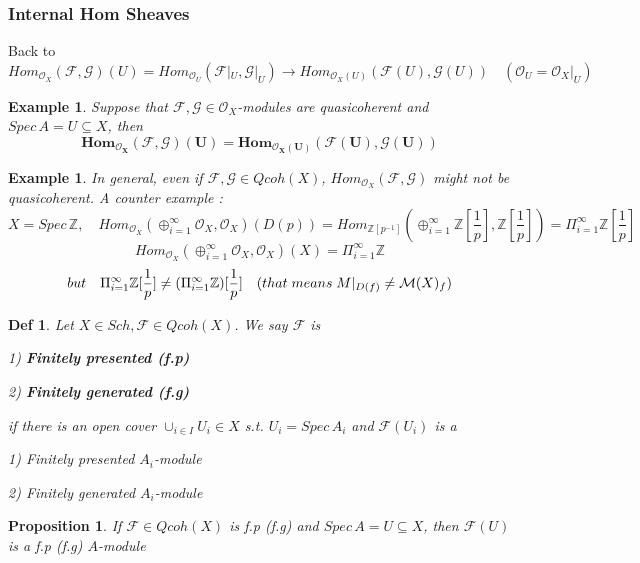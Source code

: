 \documentclass{article}
\newtheorem{definition}[theorem]{Def}
\newtheorem{example}[theorem]{Example}
\newtheorem{proposition}[theorem]{Proposition}
\begin{document}
\subsubsection{Internal Hom Sheaves}
Back to ${Hom}_{\mathcal O_X}(\mathcal F,\mathcal G)(U)
={Hom}_{\mathcal O_U}(\mathcal F|_U,\mathcal G|_U)
\to {Hom}_{\mathcal O_X(U)}(\mathcal F(U),\mathcal G(U))
\quad (\mathcal O_U=\mathcal O_X|_U)$

\begin{example}
    Suppose that $\mathcal F,\mathcal G\in \mathcal O_X$-modules are quasicoherent and $Spec\,A=U\subseteq X$, then 
    $$
    \bm{{Hom}_{\mathcal O_X}(\mathcal F,\mathcal G)(U)
    = {Hom}_{\mathcal O_X(U)}(\mathcal F(U),\mathcal G(U))} 
    $$
\end{example}

\begin{example}
    In general, even if $\mathcal F,\mathcal G\in Qcoh(X)$, ${Hom}_{\mathcal O_X}(\mathcal F,\mathcal G)$ might not be quasicoherent. A counter example :
    $$
    X=Spec\,\mathbb Z,\quad {Hom}_{\mathcal O_X}(\oplus_{i=1}^{\infty}\mathcal O_X,\mathcal O_X)(D(p))
    =Hom_{\mathbb Z[p^{-1}]}(\oplus_{i=1}^{\infty}\mathbb Z[\frac{1}{p}],\mathbb Z[\frac{1}{p}])
    =\Pi_{i=1}^{\infty}
    \mathbb Z[\frac{1}{p}]
    $$
    $$
    Hom_{\mathcal O_X}(\oplus_{i=1}^{\infty}\mathcal O_X,\mathcal O_X)(X)=\Pi_{i=1}^{\infty} \mathbb Z
    $$
    $$
    but \quad \Pi_{i=1}^{\infty}
    \mathbb Z[\frac{1}{p}]
    \ne
    (\Pi_{i=1} ^{\infty}  
    \mathbb Z) [\frac{1}{p}]\quad (that\;means\;\mathcal \mathcal M|_{D(f)}\ne \mathcal M(X)_f) 
    $$
\end{example}

\begin{definition}
    Let $X\in Sch,\mathcal F\in Qcoh(X)$. We say $\mathcal F$ is 

    1) \textbf{Finitely presented (f.p)}

    2) \textbf{Finitely generated (f.g)}

    if there is an open cover $\cup_{i\in I}U_i\in X$ s.t. $U_i=Spec\,A_i$ and $\mathcal F(U_i)$ is a

    1) Finitely presented $A_i$-module

    2) Finitely generated $A_i$-module
\end{definition}

\begin{proposition}
    If $\mathcal F\in Qcoh(X)$ is f.p (f.g) and $Spec\,A=U\subseteq X$, then $\mathcal F(U)$ is a f.p (f.g) $A$-module
\end{proposition}
\end{document}
